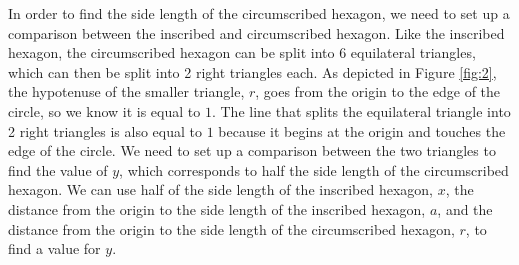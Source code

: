 \documentclass{article}
\begin{document}
\par In order to find the side length of the circumscribed hexagon, we need to set up a comparison between the inscribed and circumscribed hexagon. Like the inscribed hexagon, the circumscribed hexagon can be split into 6 equilateral triangles, which can then be split into 2 right triangles each. As depicted in Figure \ref{fig:2}, the hypotenuse of the smaller triangle, $r$, goes from the origin to the edge of the circle, so we know it is equal to $1$. The line that splits the equilateral triangle into 2 right triangles is also equal to $1$ because it begins at the origin and touches the edge of the circle. We need to set up a comparison between the two triangles to find the value of $y$, which corresponds to half the side length of the circumscribed hexagon. We can use half of the side length of the inscribed hexagon, $x$, the distance from the origin to the side length of the inscribed hexagon, $a$, and the distance from the origin to the side length of the circumscribed hexagon, $r$, to find a value for $y$. 
\clearpage
\end{document}
